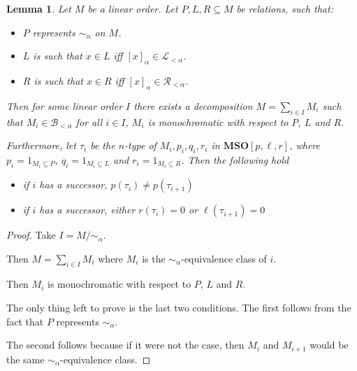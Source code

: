 \documentclass{article}
\newtheorem{lemma}{Lemma}
\newcommand{\brackets}[1]{\left[ {#1} \right]}
\newcommand{\mso}{\mathbf{MSO}}
\begin{document}
\begin{lemma}
  Let $M$ be a linear order. Let $P, L, R \subseteq M$ be relations, such that:

  \begin{itemize}
    \item $P$ represents $\sim_{\alpha}$ on $M$.
    \item $L$ is such that $x \in L$ iff $\brackets{x}_{\alpha} \in \mathcal{L}_{< \alpha}$.
    \item $R$ is such that $x \in R$ iff $\brackets{x}_{\alpha} \in \mathcal{R}_{< \alpha}$.
  \end{itemize}

  Then for some linear order $I$ there exists a decomposition
  $M = \sum_{i \in I} M_i$ such that $M_i \in \mathcal{B}_{< \alpha}$ for all $i \in I$,
  $M_i$ is monochromatic with respect to $P$, $L$ and $R$.

  Furthermore, let $\tau_i$ be the $n$-type of $M_i, p_i, q_i, r_i$ in $\mso[p, \ell, r]$,
  where $p_i = 1_{M_i \subseteq P}$, $q_i = 1_{M_i \subseteq L}$ and $r_i = 1_{M_i \subseteq R}$.
  Then the following hold
  \begin{itemize}
    \item if $i$ has a successor, $p(\tau_i) \ne p(\tau_{i+1})$
    \item if $i$ has a successor, either $r(\tau_i) = 0$ or $\ell(\tau_{i+1}) = 0$
  \end{itemize}
\end{lemma}
\begin{proof}
  Take $I = M / \sim_{\alpha}$.

  Then $M = \sum_{i \in I} M_i$ where $M_i$ is the $\sim_{\alpha}$-equivalence class of $i$.

  Then $M_i$ is monochromatic with respect to $P$, $L$ and $R$.

  The only thing left to prove is the last two conditions. The first follows from
  the fact that $P$ represents $\sim_{\alpha}$.

  The second follows because if it were not the case, then $M_i$ and $M_{i+1}$ would
  be the same $\sim_{\alpha}$-equivalence class.
\end{proof}
\end{document}
